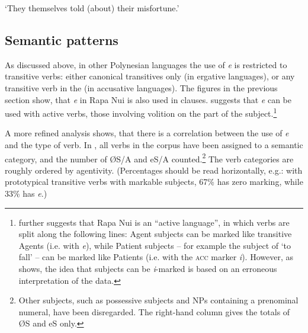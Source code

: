 \glt 
‘They themselves told (about) their misfortune.’ \textstyleExampleref{[R361.035]} 
\z

\subsection[Semantic patterns]{Semantic patterns}\label{sec:8.3.1.2}

As discussed above, in other Polynesian languages the use of  \textit{e} is restricted to transitive verbs: either canonical transitives only (in ergative languages), or any transitive verb in the  (in accusative languages). The figures in the previous section show, that \textit{e} in Rapa Nui is also used in  clauses. \citet[143]{Alexander1981OL} suggests that \textit{e} can be used with active  verbs, those involving volition on the part of the subject.\footnote{\label{fn:393}\citet[145]{Alexander1981OL} further suggests that Rapa Nui is an “active language”, in which  verbs are split along the following lines: Agent subjects can be marked like transitive Agents (i.e. with \textit{e}), while Patient subjects – for example the subject of ‘to fall’ – can be marked like Patients (i.e. with the \textsc{acc} marker \textit{i}). However, as \citet[40]{WeberN2003} shows, the idea that subjects can be \textit{i}{}-marked is based on an erroneous interpretation of the data.} 

A more refined analysis shows, that there is a correlation between the use of \textit{e} and the type of verb. In , all verbs in the corpus have been assigned to a semantic category, and the number of ØS/A and eS/A counted.\footnote{\label{fn:394}Other subjects, such as possessive subjects and NPs containing a prenominal numeral, have been disregarded. The right-hand column gives the totals of ØS and eS only.} The verb categories are roughly ordered by agentivity. (Percentages should be read horizontally, e.g.: with prototypical transitive verbs with markable subjects, 67\% has zero marking, while 33\% has \textit{e}.)


